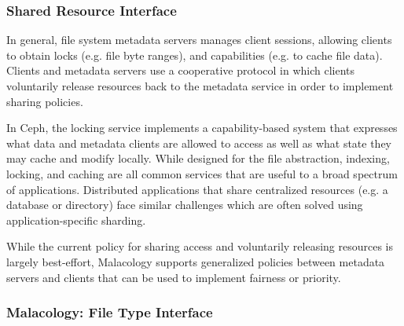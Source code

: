 
\subsubsection{Shared Resource Interface}
\label{sec:shared-resource-interface}

In general, file system metadata servers manages client sessions, allowing
clients to obtain locks (e.g. file byte ranges), and capabilities (e.g. to
cache file data). Clients and metadata servers use a cooperative protocol in
which clients voluntarily release resources back to the  metadata service in order to implement sharing policies.

 In Ceph,
the locking service implements a capability-based system that expresses what
data and  metadata clients are allowed to access as
well as what state they may cache and modify locally.  While designed for the
file abstraction, indexing, locking, and caching are all common services that
are useful to a broad spectrum of applications.  Distributed applications that
share centralized resources (e.g. a database or directory) face similar
challenges which are often solved using application-specific sharding.

 While the current policy
for sharing access and voluntarily releasing resources is largely best-effort,
Malacology supports generalized policies between metadata servers and clients
that can be used to implement fairness or priority.


\subsubsection{Malacology: File Type Interface}
\label{sec:file-type-interface}


